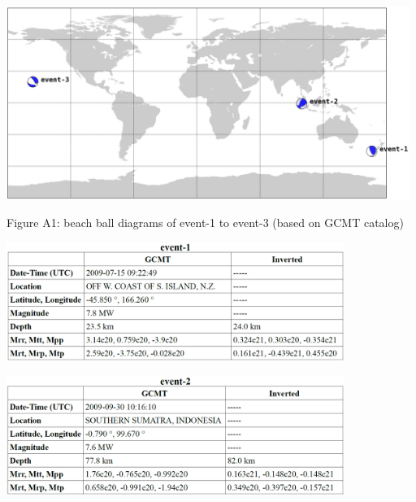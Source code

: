 \documentclass{article}
\begin{document}
\begin{center}
\includegraphics[width=372pt, height=178pt, keepaspectratio=true]{AXISEMTutorial-fig001.png}

{\small{}Figure A1: beach ball diagrams of event-1 to event-3 (based on GCMT catalog)}

\includegraphics[width=312pt, height=110pt, keepaspectratio=true]{AXISEMTutorial-fig002.png}

\includegraphics[width=312pt, height=110pt, keepaspectratio=true]{AXISEMTutorial-fig003.png}


\end{center}
\end{document}

